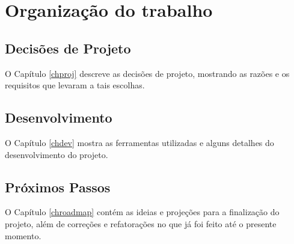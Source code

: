 \section{Organização do trabalho}

\subsection{Decisões de Projeto}
O Capítulo \ref{chproj} descreve as decisões de projeto, mostrando as razões e os requisitos que levaram a tais escolhas.

\subsection{Desenvolvimento}
O Capítulo \ref{chdev} mostra as ferramentas utilizadas e alguns detalhes do desenvolvimento do projeto.

\subsection{Próximos Passos}
O Capítulo \ref{chroadmap} contém as ideias e projeções para a finalização do projeto, além de correções e refatorações no que já foi feito até o presente momento.